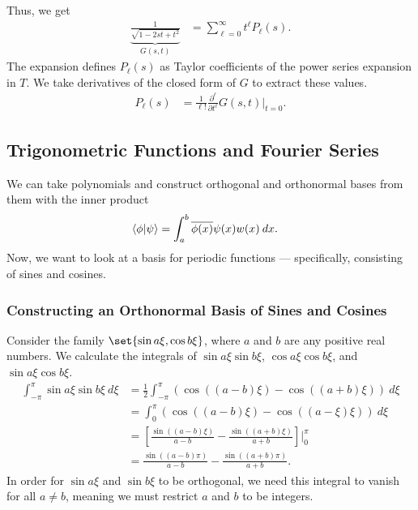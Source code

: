 \documentclass[10pt]{mypackage}
\begin{document}
\begin{example}
Thus, we get
\begin{align*}
  \underbrace{\frac{1}{\sqrt{1 - 2st + t^2}}}_{G\left(s,t\right)} &= \sum_{\ell = 0}^{\infty}t^{\ell}P_{\ell}\left(s\right).
\end{align*}
The expansion defines $P_{\ell}(s)$ as Taylor coefficients of the power series expansion in $T$. We take derivatives of the closed form of $G$ to extract these values.
\begin{align*}
  P_{\ell}\left(s\right) &= \frac{1}{\ell!}\frac{\partial^{\ell}}{\partial t^{\ell}}G\left(s,t\right)\bigr\vert_{t=0}.
\end{align*}

\end{example}
\subsection{Trigonometric Functions and Fourier Series}%
We can take polynomials and construct orthogonal and orthonormal bases from them with the inner product
\begin{align*}
  \braket{\phi}{\psi} &= \int_{a}^{b} \overline{\phi(x)}\psi(x)w(x)\:dx.
\end{align*}
Now, we want to look at a basis for periodic functions --- specifically, consisting of sines and cosines.
\subsubsection{Constructing an Orthonormal Basis of Sines and Cosines}%
Consider the family $\set{\sin a\xi, \cos b\xi}$, where $a$ and $b$ are any positive real numbers. We calculate the integrals of $\sin a \xi \sin b \xi$, $\cos a\xi \cos b\xi$, and $\sin a\xi \cos b\xi$.
\begin{align*}
  \int_{-\pi}^{\pi} \sin a \xi \sin b \xi\:d\xi &= \frac{1}{2}\int_{-\pi}^{\pi} \left(\cos\left(\left(a-b\right)\xi\right) - \cos\left(\left(a+b\right)\xi\right)\right)\:d\xi\\
                                                &= \int_{0}^{\pi} \left(\cos\left(\left(a-b\right)\xi\right) - \cos\left(\left(a-\xi\right)\xi\right)\right)\:d\xi\\
                                                &= \left[\frac{\sin\left(\left(a-b\right)\xi\right)}{a-b} - \frac{\sin\left(\left(a+b\right)\xi\right)}{a+b}\right] \bigr\vert_{0}^{\pi}\\
                                                &= \frac{\sin\left(\left(a-b\right)\pi\right)}{a-b} - \frac{\sin\left(\left(a+b\right)\pi\right)}{a+b}.
\end{align*}
In order for $\sin a\xi$ and $\sin b\xi$ to be orthogonal, we need this integral to vanish for all $a\neq b$, meaning we must restrict $a$ and $b$ to be integers.\newline
\end{document}
